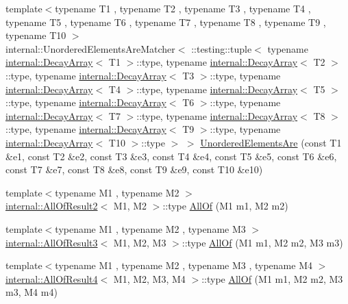 \begin{DoxyCompactItemize}
{\footnotesize template$<$typename T1 , typename T2 , typename T3 , typename T4 , typename T5 , typename T6 , typename T7 , typename T8 , typename T9 , typename T10 $>$ }\\internal\+::\+Unordered\+Elements\+Are\+Matcher$<$ \+::testing\+::tuple$<$ typename \mbox{\hyperlink{structtesting_1_1internal_1_1_decay_array}{internal\+::\+Decay\+Array}}$<$ T1 $>$\+::type, typename \mbox{\hyperlink{structtesting_1_1internal_1_1_decay_array}{internal\+::\+Decay\+Array}}$<$ T2 $>$\+::type, typename \mbox{\hyperlink{structtesting_1_1internal_1_1_decay_array}{internal\+::\+Decay\+Array}}$<$ T3 $>$\+::type, typename \mbox{\hyperlink{structtesting_1_1internal_1_1_decay_array}{internal\+::\+Decay\+Array}}$<$ T4 $>$\+::type, typename \mbox{\hyperlink{structtesting_1_1internal_1_1_decay_array}{internal\+::\+Decay\+Array}}$<$ T5 $>$\+::type, typename \mbox{\hyperlink{structtesting_1_1internal_1_1_decay_array}{internal\+::\+Decay\+Array}}$<$ T6 $>$\+::type, typename \mbox{\hyperlink{structtesting_1_1internal_1_1_decay_array}{internal\+::\+Decay\+Array}}$<$ T7 $>$\+::type, typename \mbox{\hyperlink{structtesting_1_1internal_1_1_decay_array}{internal\+::\+Decay\+Array}}$<$ T8 $>$\+::type, typename \mbox{\hyperlink{structtesting_1_1internal_1_1_decay_array}{internal\+::\+Decay\+Array}}$<$ T9 $>$\+::type, typename \mbox{\hyperlink{structtesting_1_1internal_1_1_decay_array}{internal\+::\+Decay\+Array}}$<$ T10 $>$\+::type $>$ $>$ \mbox{\hyperlink{namespacetesting_ae0e6c9754b17623a64358da8d38c4d13}{Unordered\+Elements\+Are}} (const T1 \&e1, const T2 \&e2, const T3 \&e3, const T4 \&e4, const T5 \&e5, const T6 \&e6, const T7 \&e7, const T8 \&e8, const T9 \&e9, const T10 \&e10)
\item 
{\footnotesize template$<$typename M1 , typename M2 $>$ }\\\mbox{\hyperlink{structtesting_1_1internal_1_1_all_of_result2}{internal\+::\+All\+Of\+Result2}}$<$ M1, M2 $>$\+::type \mbox{\hyperlink{namespacetesting_af7618e8606c1cb45738163688944e2b7}{All\+Of}} (M1 m1, M2 m2)
\item 
{\footnotesize template$<$typename M1 , typename M2 , typename M3 $>$ }\\\mbox{\hyperlink{structtesting_1_1internal_1_1_all_of_result3}{internal\+::\+All\+Of\+Result3}}$<$ M1, M2, M3 $>$\+::type \mbox{\hyperlink{namespacetesting_a75934d8ea6b986d2157a5ebfe68f9904}{All\+Of}} (M1 m1, M2 m2, M3 m3)
\item 
{\footnotesize template$<$typename M1 , typename M2 , typename M3 , typename M4 $>$ }\\\mbox{\hyperlink{structtesting_1_1internal_1_1_all_of_result4}{internal\+::\+All\+Of\+Result4}}$<$ M1, M2, M3, M4 $>$\+::type \mbox{\hyperlink{namespacetesting_a4a9a119cde16e43b364f3573136857a1}{All\+Of}} (M1 m1, M2 m2, M3 m3, M4 m4)

\end{DoxyCompactItemize}
